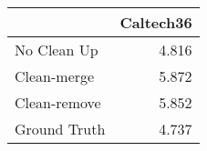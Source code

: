 \begin{tabular}{lr}
\toprule
{} & Caltech36 \\
\midrule
No Clean Up  &     4.816 \\
Clean-merge  &     5.872 \\
Clean-remove &     5.852 \\
Ground Truth &     4.737 \\
\bottomrule
\end{tabular}

